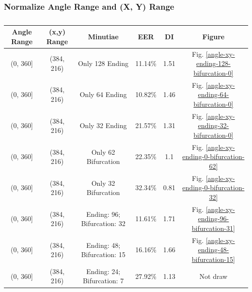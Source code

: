\subsubsection{Normalize Angle Range and (X, Y) Range}
\begin{table}[ht!]
    \centering
    \caption{}
    \begin{tabular}{cccccc}
    \hline
    Angle Range & (x,y) Range & Minutiae                    & EER     & DI   & Figure \\ \hline
    (0, 360{]}  & (384, 216)  & Only 128 Ending             & 11.14\% & 1.51 & Fig. \ref{angle-xy-ending-128-bifurcation-0}  \\
    (0, 360{]}  & (384, 216)  & Only 64 Ending              & 10.82\% & 1.46 & Fig. \ref{angle-xy-ending-64-bifurcation-0}  \\
    (0, 360{]}  & (384, 216)  & Only 32 Ending              & 21.57\% & 1.31 & Fig. \ref{angle-xy-ending-32-bifurcation-0}  \\
    (0, 360{]}  & (384, 216)  & Only 62 Bifurcation         & 22.35\% & 1.1  & Fig. \ref{angle-xy-ending-0-bifurcation-62}  \\
    (0, 360{]}  & (384, 216)  & Only 32 Bifurcation         & 32.34\% & 0.81 & Fig. \ref{angle-xy-ending-0-bifurcation-32}  \\
    (0, 360{]}  & (384, 216)  & Ending: 96; Bifurcation: 32 & 11.61\% & 1.71 & Fig. \ref{angle-xy-ending-96-bifurcation-31} \\
    (0, 360{]}  & (384, 216)  & Ending: 48; Bifurcation: 15 & 16.16\% & 1.66 & Fig. \ref{angle-xy-ending-48-bifurcation-15} \\
    (0, 360{]}  & (384, 216)  & Ending: 24; Bifurcation: 7  & 27.92\% & 1.13 & Not draw \\ \hline
    \end{tabular}
    \label{angle-xy-text-table}
\end{table}

